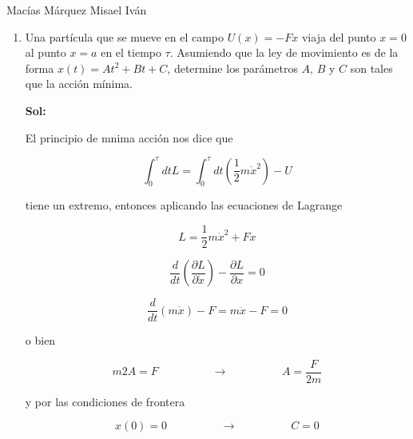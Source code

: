 \documentclass[12pt,a4paper]{article}
\begin{document}
Macías Márquez Misael Iván

\begin{enumerate}






    \item Una partícula que se mueve en el campo $U(x) = -Fx$ viaja del punto $x=0$ al punto $x=a$ en el tiempo $\tau$. Asumiendo que la ley de movimiento es de la forma $x(t) = At^2 + Bt + C$, determine los parámetros $A$, $B$ y $C$ son tales que la acción mínima.
    
    \textbf{Sol:}
    
    El principio de mnima acción nos dice que
    
    \begin{equation*}
        \int_{0}^{\tau} dt L = \int_{0}^{\tau} dt (\frac{1}{2}m \dot{x}^2) - U
    \end{equation*}
    
    tiene un extremo, entonces aplicando las ecuaciones de Lagrange 
    
    \begin{equation*}
        L= \frac{1}{2} m \dot{x}^2 + F x
    \end{equation*}
    
    \begin{equation*}
        \frac{d}{dt} \left(\frac{\partial L}{\partial \dot{x}}\right) - \frac{\partial L}{\partial x} = 0
    \end{equation*}
    
    \begin{equation*}
        \frac{d}{dt} \left(m\dot{x}\right) - F = m\ddot{x} -F = 0
    \end{equation*}
    
    o bien
    
    \begin{equation*}
        m2A =F \hspace{2cm}  \rightarrow \hspace{2cm} A = \frac{F}{2m}
    \end{equation*}
    
    y por las condiciones de frontera
    
    \begin{equation*}
        x(0) = 0 \hspace{2cm} \rightarrow \hspace{2cm} C = 0
    \end{equation*}
    

\end{enumerate}
\end{document}
